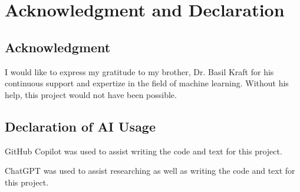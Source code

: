 


\section{Acknowledgment and Declaration}
\label{acknowledgment_declaration}

\subsection{Acknowledgment}%

I would like to express my gratitude to my brother, Dr. Basil Kraft for his continuous
support and expertize in the field of machine learning. Without his help, this project would not 
have been possible.

\subsection{Declaration of AI Usage}%

GitHub Copilot was used to assist writing the code and text for this project.

ChatGPT was used to assist researching as well as writing the code and text for this project.

\newpage
{}


